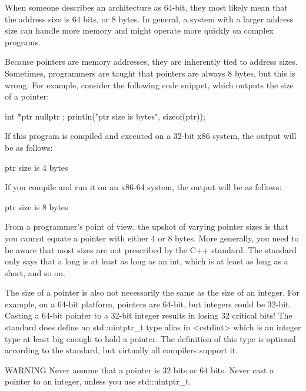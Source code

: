When someone describes an architecture as 64-bit, they most likely mean that the address size is 64 bits, or 8 bytes. In general, a system with a larger address size can handle more memory and might operate more quickly on complex programs.

Because pointers are memory addresses, they are inherently tied to address sizes. Sometimes, programmers are taught that pointers are always 8 bytes, but this is wrong. For example, consider the following code snippet, which outputs the size of a pointer:

\begin{cpp}
int *ptr { nullptr };
println("ptr size is {} bytes", sizeof(ptr));
\end{cpp}

If this program is compiled and executed on a 32-bit x86 system, the output will be as follows:

\begin{shell}
ptr size is 4 bytes
\end{shell}

If you compile and run it on an x86-64 system, the output will be as follows:

\begin{shell}
ptr size is 8 bytes
\end{shell}

From a programmer’s point of view, the upshot of varying pointer sizes is that you cannot equate a pointer with either 4 or 8 bytes. More generally, you need to be aware that most sizes are not prescribed by the C++ standard. The standard only says that a long is at least as long as an int, which is at least as long as a short, and so on.

The size of a pointer is also not necessarily the same as the size of an integer. For example, on a 64-bit platform, pointers are 64-bit, but integers could be 32-bit. Casting a 64-bit pointer to a 32-bit integer results in losing 32 critical bits! The standard does define an std::uintptr\_t type alias in <cstdint> which is an integer type at least big enough to hold a pointer. The definition of this type is optional according to the standard, but virtually all compilers support it.

\begin{myWarning}{WARNING}
Never assume that a pointer is 32 bits or 64 bits. Never cast a pointer to an integer, unless you use std::uintptr\_t.
\end{myWarning}



